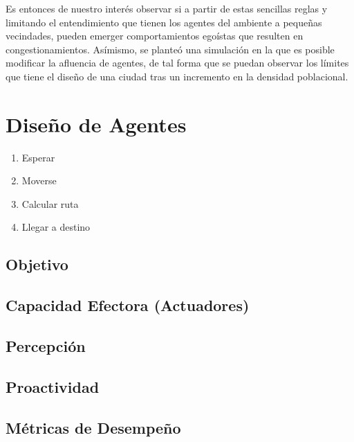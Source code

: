 \documentclass[twoside,11pt]{article}
\begin{document}
Es entonces de nuestro interés observar si a partir de estas sencillas reglas y limitando el entendimiento 
que tienen los agentes del ambiente a pequeñas vecindades, pueden emerger comportamientos egoístas que resulten
en congestionamientos. Asímismo, se planteó una simulación en la que es posible modificar la afluencia de agentes,
de tal forma que se puedan observar los límites que tiene el diseño de una ciudad tras un incremento en la densidad
poblacional.

\section{Diseño de Agentes}

\begin{enumerate}
    \item Esperar
    
    \item Moverse

    \item Calcular ruta

    \item Llegar a destino
\end{enumerate}


\subsection{Objetivo}
\subsection{Capacidad Efectora (Actuadores)}
\subsection{Percepción}
\subsection{Proactividad}
\subsection{Métricas de Desempeño}
\end{document}
